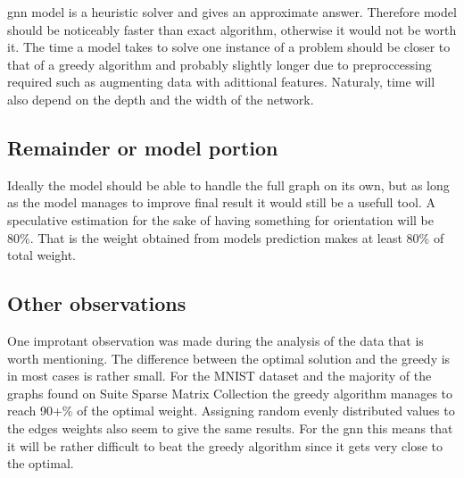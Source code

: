 \gls{gnn} model is a heuristic solver and gives an approximate answer. Therefore model should be noticeably faster than exact algorithm, otherwise it would not be worth it. The time a model takes to solve one instance of a problem should be closer to that of a greedy algorithm and probably slightly longer due to preproccessing required such as augmenting data with adittional features. Naturaly, time will also depend on the depth and the width of the network.

\subsection{Remainder or model portion}

Ideally the model should be able to handle the full graph on its own, but as long as the model manages to improve final result it would still be a usefull tool. A speculative estimation for the sake of having something for orientation will be 80\%. That is the weight obtained from models prediction makes at least 80\% of total weight.

\subsection{Other observations}

One improtant observation was made during the analysis of the data that is worth mentioning. The difference between the optimal solution and the greedy is in most cases is rather small. For the MNIST dataset and the majority of the graphs found on Suite Sparse Matrix Collection the greedy algorithm manages to reach 90+\% of the optimal weight. Assigning random evenly distributed values to the edges weights also seem to give the same results. For the \gls{gnn} this means that it will be rather difficult to beat the greedy algorithm since it gets very close to the optimal.
